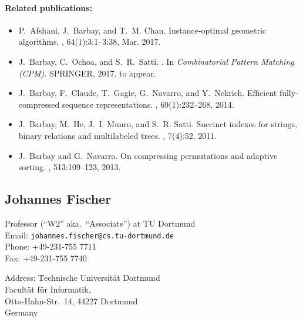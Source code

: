 \documentclass[a4paper,10pt]{article}
\begin{document}
\paragraph{Related publications:}
\begin{itemize}
\item 
P.~Afshani, J.~Barbay, and T.~M. Chan.
\newblock Instance-optimal geometric algorithms.
, 64(1):3:1--3:38, Mar. 2017.


\item
J.~{Barbay}, C.~{Ochoa}, and S.~R.~{Satti}.
.
\newblock In {\em Combinatorial Pattern Matching (CPM)}. SPRINGER, 2017.
\newblock to appear.

\item
J.~Barbay, F.~Claude, T.~Gagie, G.~Navarro, and Y.~Nekrich.
\newblock Efficient fully-compressed sequence representations.
, 69(1):232--268, 2014.

\item
J.~Barbay, M.~He, J.~I. Munro, and S.~R. Satti.
\newblock Succinct indexes for strings, binary relations and multilabeled
  trees.
 , 7(4):52, 2011.

\item
J.~Barbay and G.~Navarro.
\newblock On compressing permutations and adaptive sorting.
, 513:109--123, 2013.
\end{itemize}


\subsection*{Johannes Fischer}

\begin{multicols}{2}
\noindent Professor (``W2'' aka.\ ``Associate'') at TU Dortmund\\
Email: \texttt{johannes.fischer@cs.tu-dortmund.de} \\
Phone:  +49-231-755 7711\\
Fax: +49-231-755 7740
\begin{tabbing}
Address: \= Technische Universit\"at Dortmund\\
\> Facult\"at f\"ur Informatik, \\
\> Otto-Hahn-Str.\ 14, 44227 Dortmund\\
\> Germany
\end{tabbing}
\end{multicols}
\end{document}
